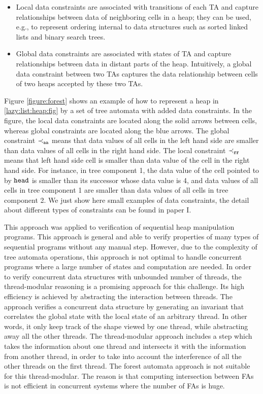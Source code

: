  \begin{itemize}
 	\item Local data constraints are associated with transitions of each TA and capture relationships between data of neighboring cells in a heap; they can be used, e.g., to represent ordering internal to data structures such as sorted linked lists and binary search trees.
 	\item Global data constraints are associated with states of TA and capture relationships between data in distant parts of the heap. Intuitively, a global data constraint between two TAs captures the data relationship between cells of two heaps accepted by these two TAs. 
 \end{itemize}
Figure \ref{figure:forest} shows an example of how to represent a heap in \ref{lazy:list:heap:fig} by a set of tree automata with added data constraints. In the figure, the local data constraints are located along the solid arrows between cells, whereas global constraints are located along the blue arrows. The global constraint $\tt \prec_{aa}$ means that data values of all cells in the left hand side are smaller than data values of all cells in the right hand side. The local constraint $\tt \prec_{rr}$ means that left hand side cell is smaller than data value of the cell in the right hand side. For instance, in tree component 1, the data value of the cell pointed to by $\tt head$ is smaller than its successor whose data value is 4, and data values of all cells in tree component 1 are smaller than data values of all cells in tree component 2. We just show here small examples of data constraints, the detail about different types of constraints can be found in paper I.    

This approach was applied to verification of sequential heap manipulation programs. This approach is general and able to verify properties of many types of sequential programs without any manual step. However, due to the complexity of tree automata operations, this approach is not optimal to handle concurrent programs where a large number of states and computation are needed. 
In order to verify concurrent data structures with unbounded number of threads, the thread-modular reasoning	 is a promising approach for this challenge. Its high efficiency is achieved by
abstracting the interaction between threads. The approach verifies a concurrent data structure by generating an invariant that correlates the global state with the local state of an
arbitrary thread. In other words, it only keep track of the shape viewed by one thread, while abstracting away all the other threads. The thread-modular
approach includes a step which takes the information about one thread and
intersects it with the information from another thread, in order to take into account the interference of all the other threads on the first thread. The forest automata approach is not suitable for this thread-modular. The reason is that computing intersection between FAs is not efficient in concurrent systems where the number of FAs is huge. 

